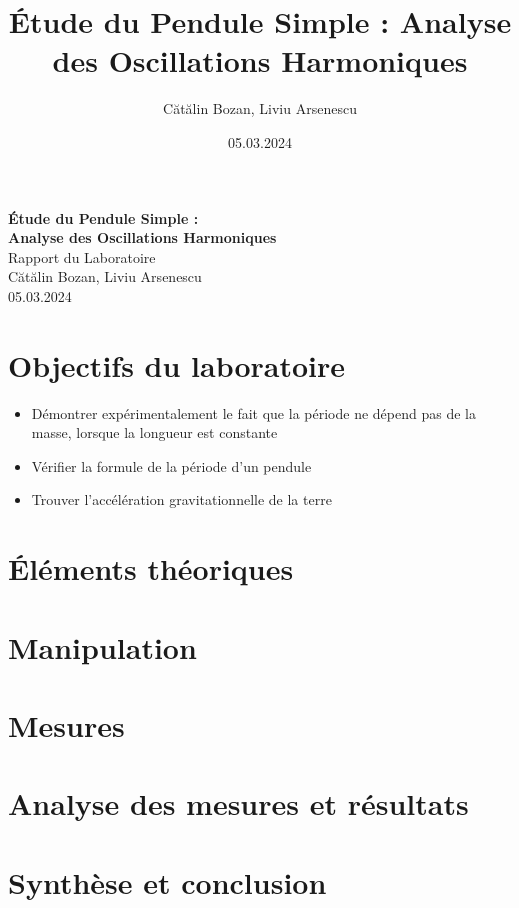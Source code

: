 \documentclass[12pt,a4paper]{article}
\title{Étude du Pendule Simple : Analyse des Oscillations Harmoniques}
\author{Cătălin Bozan, Liviu Arsenescu}
\date{05.03.2024}
\begin{document}
    \begin{titlepage}
        \begin{center}
            \vspace*{\fill}
            \Huge \textbf{Étude du Pendule Simple :} \\
            \Huge \textbf{Analyse des Oscillations Harmoniques} \\
            \Large Rapport du Laboratoire \\
            \vspace{\fill}
            \Large Cătălin Bozan, Liviu Arsenescu \\
            05.03.2024

            \vspace*{\fill}
        \end{center}
    \end{titlepage}
    \newpage

    \section{Objectifs du laboratoire}
    \begin{itemize}
        \item Démontrer expérimentalement le fait que la période ne dépend pas de la masse, lorsque la longueur est constante
        \item Vérifier la formule de la période d'un pendule
        \item Trouver l'accélération gravitationnelle de la terre
    \end{itemize}
    \newpage

    \section{Éléments théoriques}
    \newpage

    \section{Manipulation}
    \newpage

    \section{Mesures}
    \newpage

    \section{Analyse des mesures et résultats}
    \newpage

    \section{Synthèse et conclusion}
\end{document}
